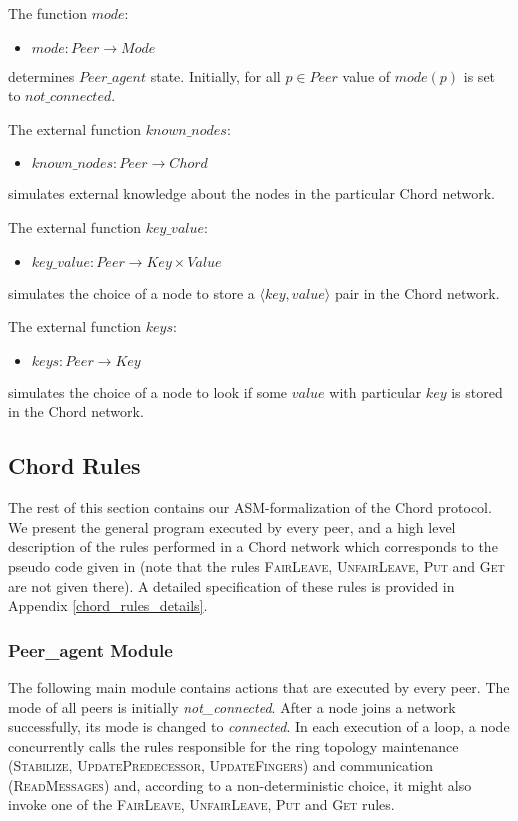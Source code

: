 \documentclass{amsart}
\theoremstyle{definition}
\begin{document}
The function $mode$:
\begin{itemize}
\item $mode: Peer \rightarrow Mode$
\end{itemize}
determines $Peer\_agent$ state. Initially, for all $p \in Peer$ value of $mode(p)$ is set to $not\_connected$.




The external function $known\_nodes$:
\begin{itemize}
  \item $known\_nodes: Peer \rightarrow Chord$
\end{itemize}
simulates external knowledge about the nodes in the particular Chord network.

The external function $key\_value$:
\begin{itemize}
  \item $key\_value: Peer \rightarrow Key \times Value$
\end{itemize}
simulates the choice of a node to store a $\langle key,
value\rangle$ pair in the Chord network.

The external function $keys$:
\begin{itemize}
  \item $keys: Peer \rightarrow Key$
\end{itemize}
simulates the choice of a node to look if some $value$ with particular $key$ is stored in the Chord network.


\subsection{Chord Rules}
\label{peer_modul}

The rest of this section contains our ASM-formalization of the
Chord protocol. We present the general program executed by every
peer, and a high level description of the rules performed in a
Chord network which corresponds to the pseudo code given in
\cite{Chord-IEEE} (note that the rules \textsc{FairLeave},
\textsc{UnfairLeave}, \textsc{Put} and \textsc{Get} are not given
there). A detailed specification of these rules is provided in
Appendix \ref{chord_rules_details}.


\subsubsection{Peer\_agent Module}

The following main module contains actions that are executed by
every peer. The mode of all peers is initially {\em
not\_connected}. After a node joins a network successfully, its
mode is changed to {\em connected}. In each execution of a loop, a
node concurrently calls the rules responsible for the ring
topology maintenance (\textsc{Stabilize},
\textsc{UpdatePredecessor}, \textsc{UpdateFingers}) and
communication (\textsc{ReadMessages}) and, according to a
non-deterministic choice, it might also invoke one of the
\textsc{FairLeave}, \textsc{UnfairLeave}, \textsc{Put} and
\textsc{Get} rules.
\end{document}
